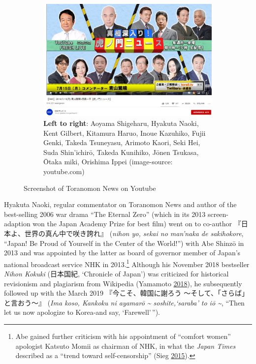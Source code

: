 \documentclass[10pt,british,A4paper,,openany]{memoir}
\begin{document}
\begin{figure}[!htb]
 \centering
 \begin{subfigure}[b]{0.5\textwidth}
  \includegraphics[width=\textwidth]{images/2channel/toranomon.jpg} 
  \captionsetup[sub]{font=scriptsize}
  \caption*{\textbf{Left to right}: Aoyama Shigeharu, Hyakuta Naoki, Kent Gilbert, Kitamura Haruo, Inoue Kazuhiko, Fujii Genki, Takeda Tsuneyasu, Arimoto Kaori, Seki Hei, Suda Shin'ichirō, Takeda Kunihiko, Jōnen Tsukasa, Ōtaka miki, Orishima Ippei (image-source: youtube.com)}
 \end{subfigure}
 \caption{Screenshot of Toranomon News on Youtube}\label{fig:toranomon}
\end{figure}

Hyakuta Naoki, regular commentator on Toranomon News and author of the
best-selling 2006 war drama ``The Eternal Zero'' (which in its 2013
screen-adaption won the Japan Academy Prize for best film) went on to
co-author 『日本よ、世界の真ん中で咲き誇れ』 (\emph{nihon yo, sekai no
man'naka de sakihokore}, ``Japan! Be Proud of Yourself in the Center of
the World!'') with Abe Shinzō in 2013 and was appointed by the latter as
board of governor member of Japan's national broadcast service NHK in
2013.\footnote{Abe gained further criticism with his appointment of
  ``comfort women'' apologist Katsuto Momii as chairman of NHK, in what
  the \emph{Japan Times} described as a ``trend toward self-censorship''
  (Sieg \protect\hyperlink{ref-sieg_under_2015}{2015}).} Although his
November 2018 bestseller \emph{Nihon Kokuki} (日本国紀, `Chronicle of
Japan') was criticized for historical revisionism and plagiarism from
Wikipedia (Yamamoto \protect\hyperlink{ref-yamamoto__2018}{2018}), he
subsequently followed up with the March 2019 『今こそ、韓国に謝ろう
～そして、「さらば」と言おう～』 (\emph{Ima koso, Kankoku ni ayamarō
\textasciitilde{} soshite,`saraba' to iō \textasciitilde{}}, ``Then let
us now apologize to Korea-and say, `Farewell'\,'').
\end{document}
